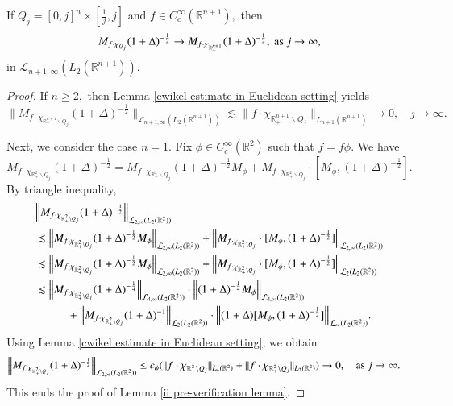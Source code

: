 \documentclass[12pt]{amsart}
\begin{document}
\begin{lemma}\label{ii pre-verification lemma} If $Q_j=[0,j]^n\times[\frac1j,j]$ and $f\in C^{\infty}_c(\mathbb{R}^{n+1}),$ then
$$M_{f\cdot\chi_{Q_j}}(1+\Delta)^{-\frac12}\to M_{f\cdot\chi_{\mathbb{R}^{n+1}_+}}(1+\Delta)^{-\frac12},\ {\rm as}\ j\rightarrow \infty,$$
in $\mathcal{L}_{n+1,\infty}(L_2(\mathbb{R}^{n+1})).$
\end{lemma}
\begin{proof} If $n\geq 2,$ then Lemma \ref{cwikel estimate in Euclidean setting} yields
$$\Big\|M_{f\cdot\chi_{\mathbb{R}^{n+1}_+\backslash Q_j}}(1+\Delta)^{-\frac12}\Big\|_{\mathcal{L}_{n+1,\infty}(L_2(\mathbb{R}^{n+1}))}\lesssim\|f\cdot\chi_{\mathbb{R}^{n+1}_+\backslash Q_j}\|_{L_{n+1}(\mathbb{R}^{n+1})}\to0,\quad j\to\infty.$$

Next, we consider the case $n=1.$ Fix $\phi\in C^{\infty}_c(\mathbb{R}^2)$ such that $f=f\phi.$ We have
$$M_{f\cdot\chi_{\mathbb{R}^2_+\backslash Q_j}}(1+\Delta)^{-\frac12}=M_{f\cdot\chi_{\mathbb{R}^2_+\backslash Q_j}}(1+\Delta)^{-\frac12}M_{\phi}+M_{f\cdot\chi_{\mathbb{R}^2_+\backslash Q_j}}\cdot[M_{\phi},(1+\Delta)^{-\frac12}].$$
By triangle inequality,
\begin{align*}
&\Big\|M_{f\cdot\chi_{\mathbb{R}^2_+\backslash Q_j}}(1+\Delta)^{-\frac12}\Big\|_{\mathcal{L}_{2,\infty}(L_2(\mathbb{R}^2))}\\
&\lesssim\Big\|M_{f\cdot\chi_{\mathbb{R}^2_+\backslash Q_j}}(1+\Delta)^{-\frac12}M_{\phi}\Big\|_{\mathcal{L}_{2,\infty}(L_2(\mathbb{R}^2))}+\Big\|M_{f\cdot\chi_{\mathbb{R}^2_+\backslash Q_j}}\cdot[M_{\phi},(1+\Delta)^{-\frac12}]\Big\|_{\mathcal{L}_{2,\infty}(L_2(\mathbb{R}^2))}\\
&\lesssim\Big\|M_{f\cdot\chi_{\mathbb{R}^2_+\backslash Q_j}}(1+\Delta)^{-\frac12}M_{\phi}\Big\|_{\mathcal{L}_{2,\infty}(L_2(\mathbb{R}^2))}+\Big\|M_{f\cdot\chi_{\mathbb{R}^2_+\backslash Q_j}}\cdot[M_{\phi},(1+\Delta)^{-\frac12}]\Big\|_{\mathcal{L}_2(L_2(\mathbb{R}^2))}\\
&\lesssim\Big\|M_{f\cdot\chi_{\mathbb{R}^2_+\backslash Q_j}}(1+\Delta)^{-\frac14}\Big\|_{\mathcal{L}_{4,\infty}(L_2(\mathbb{R}^2))}\cdot \Big\|(1+\Delta)^{-\frac14}M_{\phi}\Big\|_{\mathcal{L}_{4,\infty}(L_2(\mathbb{R}^2))}\\
&\hspace{1.0cm}+\Big\|M_{f\cdot\chi_{\mathbb{R}^2_+\backslash Q_j}}(1+\Delta)^{-1}\Big\|_{\mathcal{L}_2(L_2(\mathbb{R}^2))}\cdot\Big\|(1+\Delta)[M_{\phi},(1+\Delta)^{-\frac12}]\Big\|_{\mathcal{L}_{\infty}(L_2(\mathbb{R}^2))}.
\end{align*}
Using Lemma \ref{cwikel estimate in Euclidean setting}, we obtain
\begin{align*}
\Big\|M_{f\cdot\chi_{\mathbb{R}^2_+\backslash Q_j}}(1+\Delta)^{-\frac12}\Big\|_{\mathcal{L}_{2,\infty}(L_2(\mathbb{R}^2))}
&\leq c_{\phi}(\|f\cdot\chi_{\mathbb{R}^2_+\backslash Q_j}\|_{L_4(\mathbb{R}^2)}+\|f\cdot\chi_{\mathbb{R}^2_+\backslash Q_j}\|_{L_2(\mathbb{R}^2)})\to0,\quad {\rm as}\ j\to\infty.
\end{align*}
This ends the proof of Lemma \ref{ii pre-verification lemma}.
\end{proof}
\end{document}
